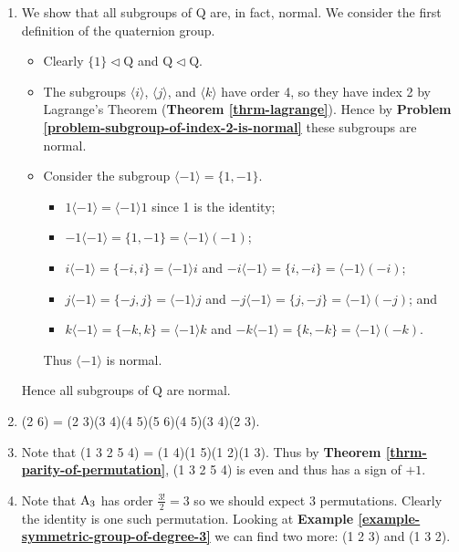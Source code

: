 \begin{enumerate}
    \item We show that all subgroups of $\mathrm{Q}$ are, in fact, normal. We consider the first definition of the quaternion group.
    \begin{itemize}
        \item Clearly $\{1\} \lhd \mathrm{Q}$ and $\mathrm{Q} \lhd \mathrm{Q}$.
        \item The subgroups $\langle i\rangle$, $\langle j\rangle$, and $\langle k\rangle$ have order 4, so they have index 2 by Lagrange's Theorem (\textbf{Theorem \ref{thrm-lagrange}}). Hence by \textbf{Problem \ref{problem-subgroup-of-index-2-is-normal}} these subgroups are normal.
        \item Consider the subgroup $\langle -1 \rangle = \{1, -1\}$. \begin{itemize}
            \item $1\langle -1 \rangle = \langle -1 \rangle1$ since 1 is the identity;
            \item $-1\langle -1 \rangle = \{1, -1\} = \langle -1 \rangle(-1)$;
            \item $i\langle -1 \rangle = \{-i, i\} = \langle -1 \rangle i$ and $-i\langle -1 \rangle = \{i, -i\} = \langle -1 \rangle (-i)$;
            \item $j\langle -1 \rangle = \{-j, j\} = \langle -1 \rangle j$ and $-j\langle -1 \rangle = \{j, -j\} = \langle -1 \rangle (-j)$; and
            \item $k\langle -1 \rangle = \{-k, k\} = \langle -1 \rangle k$ and $-k\langle -1 \rangle = \{k, -k\} = \langle -1 \rangle (-k)$.
        \end{itemize}
        Thus $\langle -1 \rangle$ is normal.
    \end{itemize}
    Hence all subgroups of $\mathrm{Q}$ are normal.

    \item (2 6) = (2 3)(3 4)(4 5)(5 6)(4 5)(3 4)(2 3).

    \item Note that (1 3 2 5 4) = (1 4)(1 5)(1 2)(1 3). Thus by \textbf{Theorem \ref{thrm-parity-of-permutation}}, (1 3 2 5 4) is even and thus has a sign of $+1$.

    \item Note that $\mathrm{A}_{3}$ has order $\frac{3!}{2} = 3$ so we should expect 3 permutations. Clearly the identity is one such permutation. Looking at \textbf{Example \ref{example-symmetric-group-of-degree-3}} we can find two more: (1 2 3) and (1 3 2).


\end{enumerate}

